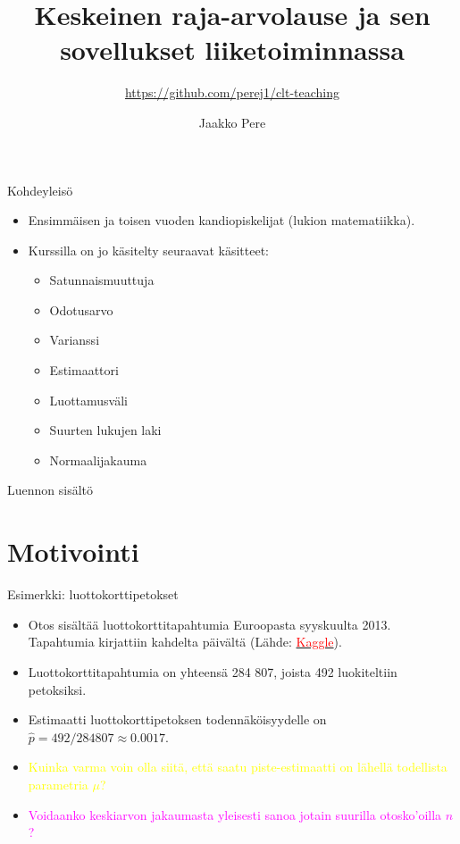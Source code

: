 \documentclass{beamer}
\title{Keskeinen raja-arvolause ja sen sovellukset liiketoiminnassa}
\subtitle{\url{https://github.com/perej1/clt-teaching}}
\author{Jaakko Pere}
\date{\displaydate{date}}
\begin{document}
\frame{\titlepage}


\begin{frame}{Kohdeyleisö}
  \begin{itemize}
    \item Ensimmäisen ja toisen vuoden kandiopiskelijat (lukion matematiikka).
    \pause
    \item Kurssilla on jo käsitelty seuraavat käsitteet:
    \begin{itemize}
      \item Satunnaismuuttuja
      \item Odotusarvo
      \item Varianssi
      \item Estimaattori
      \item Luottamusväli
      \item Suurten lukujen laki
      \item Normaalijakauma
    \end{itemize}
  \end{itemize}
\end{frame}


\begin{frame}{Luennon sisältö}
  \tableofcontents
\end{frame}


\section{Motivointi}


\begin{frame}{Esimerkki: luottokorttipetokset}
  \begin{itemize}
    \item Otos sisältää luottokorttitapahtumia Euroopasta syyskuulta 2013.
    Tapahtumia kirjattiin kahdelta päivältä (Lähde:
    \href{https://www.kaggle.com/datasets/mlg-ulb/creditcardfraud?resource=download}{\textcolor{red}{Kaggle}}).
    \pause
    \item Luottokorttitapahtumia on yhteensä 284 807, joista 492 luokiteltiin
    petoksiksi.
    \pause
    \item Estimaatti luottokorttipetoksen todennäköisyydelle on $\hat p = 492 /
    284 807\approx 0.0017$.
    \pause
    \item \textcolor{yellow}{Kuinka varma voin olla siitä, että saatu
    piste-estimaatti on lähellä todellista parametria $\mu$?}
    \pause
    \item \textcolor{magenta}{Voidaanko keskiarvon jakaumasta yleisesti sanoa
    jotain suurilla otosko'oilla $n$?}
  \end{itemize}
\end{frame}
\end{document}
